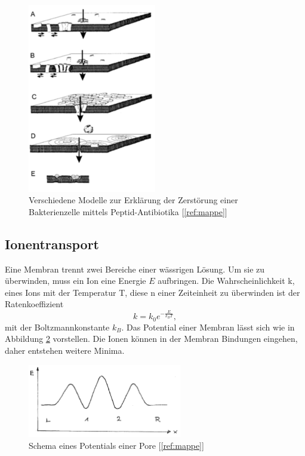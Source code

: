\documentclass[a4paper,ngerman]{scrartcl}
\begin{document}
\begin{figure}
\includegraphics[width=0.5\textwidth]{wirkmechanismus.png}
\caption{Verschiedene Modelle zur Erklärung der Zerstörung einer Bakterienzelle mittels Peptid-Antibiotika [\ref{ref:mappe}]}
\label{fig:wirkmechanismus}
\end{figure}


\subsection{Ionentransport}

Eine Membran trennt zwei Bereiche einer wässrigen Lösung. Um sie zu überwinden, muss ein Ion eine Energie $E$ aufbringen. Die  Wahrscheinlichkeit k, eines Ions mit der Temperatur T, diese n einer Zeiteinheit zu überwinden ist der Ratenkoeffizient
\begin{equation} \label{eqn:rate}
k = k_0 e^{-\frac{E}{k_B T}},
\end{equation}
mit der Boltzmannkonstante $k_{B}$. Das Potential einer Membran lässt sich wie in Abbildung \ref{fig:potential-einfach} vorstellen. Die Ionen können in der Membran Bindungen eingehen, daher entstehen weitere Minima.

\begin{figure}
\includegraphics[width=0.6\textwidth]{potential-einfach.png}
\caption{Schema eines Potentials einer Pore [\ref{ref:mappe}]}
\label{fig:potential-einfach}
\end{figure}
\end{document}

